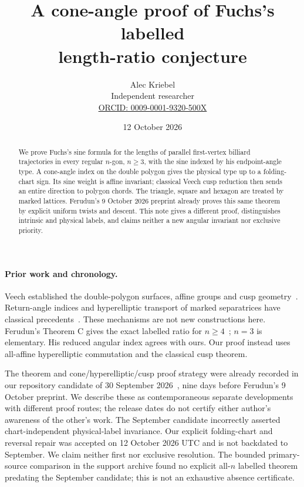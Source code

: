 \documentclass[11pt]{article}
\title{A cone-angle proof of Fuchs's labelled\\length-ratio conjecture}
\author{Alec Kriebel\\\small Independent researcher\\
\small \href{https://orcid.org/0009-0001-9320-500X}{ORCID: 0009-0001-9320-500X}}
\date{12 October 2026}
\begin{document}
\maketitle
\begin{abstract}
We prove Fuchs's sine formula for the lengths of parallel first-vertex billiard trajectories in every regular \(n\)-gon, \(n\ge3\), with the sine indexed by his endpoint-angle type. A cone-angle index on the double polygon gives the physical type up to a folding-chart sign. Its sine weight is affine invariant; classical Veech cusp reduction then sends an entire direction to polygon chords. The triangle, square and hexagon are treated by marked lattices. Ferudun's 9 October 2026 preprint already proves this same theorem by explicit uniform twists and descent. This note gives a different proof, distinguishes intrinsic and physical labels, and claims neither a new angular invariant nor exclusive priority.
\end{abstract}
\paragraph{Prior work and chronology.}
Veech established the double-polygon surfaces, affine groups and cusp geometry~\cite{Veech,Finster}. Return-angle indices and hyperelliptic transport of marked separatrices have classical precedents~\cite{EMZ,Boissy}. These mechanisms are not new constructions here. Ferudun's Theorem C gives the exact labelled ratio for \(n\ge4\)~\cite[Sections~2--3]{Ferudun}; \(n=3\) is elementary. His reduced angular index agrees with ours. Our proof instead uses all-affine hyperelliptic commutation and the classical cusp theorem.

The theorem and cone/hyperelliptic/cusp proof strategy were already recorded in our repository candidate of 30 September 2026~\cite{Repository}, nine days before Ferudun's 9 October preprint. We describe these as contemporaneous separate developments with different proof routes; the release dates do not certify either author's awareness of the other's work. The September candidate incorrectly asserted chart-independent physical-label invariance. Our explicit folding-chart and reversal repair was accepted on 12 October 2026 UTC and is not backdated to September. We claim neither first nor exclusive resolution. The bounded primary-source comparison in the support archive found no explicit all-\(n\) labelled theorem predating the September candidate; this is not an exhaustive absence certificate.
\end{document}
